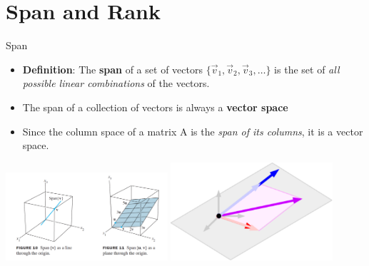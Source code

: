 \section{Span and Rank}

\begin{frame}{Span}
    \begin{itemize}
        \item \textbf{Definition}: The \textbf{span} of a set of vectors $\{\vec{v}_1, \vec{v}_2, \vec{v}_3, \dots\}$ is the set of \textit{all possible linear combinations} of the vectors.
        \item The span of a collection of vectors is always a \textbf{vector space}
        \item Since the column space of a matrix A is the \textit{span of its columns}, it is a vector space.
    \end{itemize}
    \begin{center}
        \includegraphics[width = 0.45\textwidth]{images/span1.png}
        \includegraphics[width = 0.45\textwidth]{images/span2.png}
    \end{center}
\end{frame}

